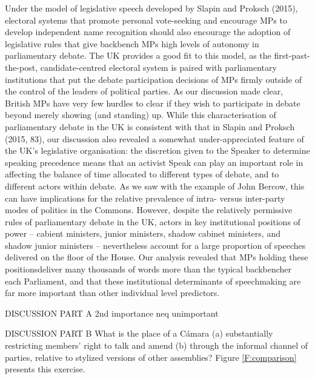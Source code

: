Under the model of legislative speech developed by Slapin and Proksch (2015), electoral systems
that promote personal vote-seeking and encourage MPs to develop independent name
recognition should also encourage the adoption of legislative rules that give backbench MPs high
levels of autonomy in parliamentary debate. The UK provides a good fit to this model, as the
first-past-the-post, candidate-centred electoral system is paired with parliamentary institutions
that put the debate participation decisions of MPs firmly outside of the control of the leaders of
political parties. As our discussion made clear, British MPs have very few hurdles to clear if they
wish to participate in debate beyond merely showing (and standing) up.
While this characterisation of parliamentary debate in the UK is consistent with that in
Slapin and Proksch (2015, 83), our discussion also revealed a somewhat under-appreciated
feature of the UK’s legislative organisation: the discretion given to the Speaker to determine
speaking precedence means that an activist Speak can play an important role in affecting the
balance of time allocated to different types of debate, and to different actors within debate. As we
saw with the example of John Bercow, this can have implications for the relative prevalence of
intra- versus inter-party modes of politics in the Commons.
However, despite the relatively permissive rules of parliamentary debate in the UK, actors
in key institutional positions of power – cabient ministers, junior ministers, shadow cabinet
ministers, and shadow junior ministers – nevertheless account for a large proportion of speeches
delivered on the floor of the House. Our analysis revealed that MPs holding these positionsdeliver many thousands of words more than the typical backbencher each Parliament, and that
these institutional determinants of speechmaking are far more important than other individual
level predictors.





DISCUSSION PART A
2nd importance neq unimportant

DISCUSSION PART B
What is the place of a Cámara (a) substantially restricting members' right to talk and amend (b) through the informal channel of parties, relative to stylized versions of other assemblies? Figure \ref{F:comparison} presents this exercise.

